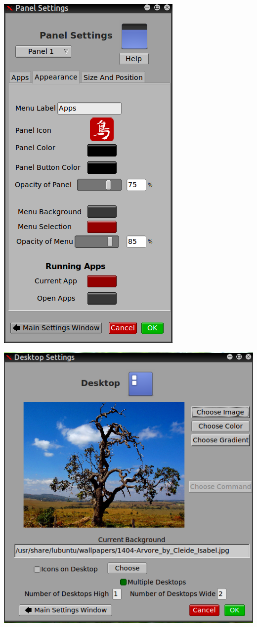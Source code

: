 \documentclass[12pt,a4paper]{book}
\begin{document}
\begin{center}
\includegraphics[width=0.7\linewidth]{screen-shots/panel-settings}
\end{center}


\begin{center}
\includegraphics[width=0.7\linewidth]{screen-shots/desktop-settings}
\end{center}
\end{document}
